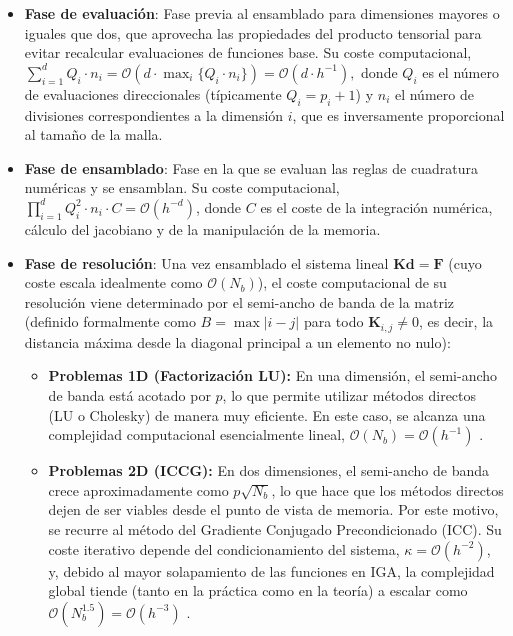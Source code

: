 \documentclass[11pt]{book}
\theoremstyle{plain} %
\theoremstyle{definition} %
\theoremstyle{definition} %
\begin{document}
\vspace{-0.2cm}
\begin{itemize}
    \item \textbf{Fase de evaluación}: Fase previa al ensamblado para dimensiones mayores o iguales que dos, que aprovecha las propiedades del producto tensorial para evitar recalcular evaluaciones de funciones base. Su coste computacional,
    $\sum_{i=1}^{d}Q_i\cdot n_i = \mathcal{O}(d\cdot\max_i\{Q_i\cdot n_i\}) = \mathcal{O}(d \cdot h^{-1}),$
    donde $Q_i$ es el número de evaluaciones direccionales (típicamente $Q_i = p_i + 1$) y $n_i$ el número de divisiones correspondientes a la dimensión $i$, que es inversamente proporcional al tamaño de la malla.

    \item \textbf{Fase de ensamblado}: Fase en la que se evaluan las reglas de cuadratura numéricas y se ensamblan. Su coste computacional,
    $\prod_{i=1}^d Q_i^2 \cdot n_i \cdot C = \mathcal{O}(h^{-d})$,
    donde $C$ es el coste de la integración numérica, cálculo del jacobiano y de la manipulación de la memoria.

    \item \textbf{Fase de resolución}: Una vez ensamblado el sistema lineal $\mathbf{K}\mathbf{d} = \mathbf{F}$ (cuyo coste escala idealmente como $\mathcal{O}(N_b)$), el coste computacional de su resolución viene determinado por el semi-ancho de banda de la matriz (definido formalmente como $B = \max |i-j|$ para todo $\mathbf{K}_{i,j} \neq 0$, es decir, la distancia máxima desde la diagonal principal a un elemento no nulo):
    \begin{itemize}
        \item \textbf{Problemas 1D (Factorización LU):} En una dimensión, el semi-ancho de banda está acotado por $p$, lo que permite utilizar métodos directos (LU o Cholesky) de manera muy eficiente. En este caso, se alcanza una complejidad computacional esencialmente lineal, $\mathcal{O}(N_b)=\mathcal{O}(h^{-1})$ \cite{golub_matrix_2013}.
        
        \item \textbf{Problemas 2D (ICCG):} En dos dimensiones, el semi-ancho de banda crece aproximadamente como $p\sqrt{N_b}$, lo que hace que los métodos directos dejen de ser viables desde el punto de vista de memoria. Por este motivo, se recurre al método del Gradiente Conjugado Precondicionado (ICC). Su coste iterativo depende del condicionamiento del sistema, $\kappa = \mathcal{O}(h^{-2})$, y, debido al mayor solapamiento de las funciones en IGA, la complejidad global tiende (tanto en la práctica como en la teoría) a escalar como $\mathcal{O}(N_b^{1.5})=\mathcal{O}(h^{-3})$ \cite{saad_iterative_2003}.
    \end{itemize}
\end{itemize}
\end{document}
